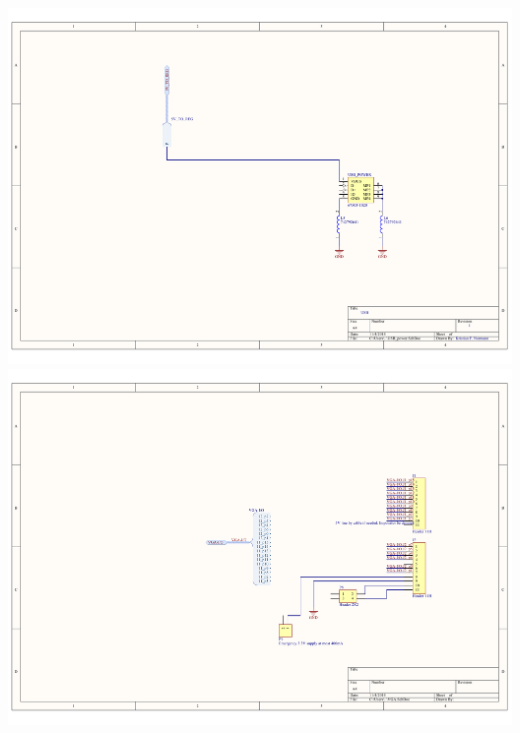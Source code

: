 \documentclass[../main/report.tex]{subfiles}
\begin{document}
\newpage
\includegraphics[width=\paperwidth]{../appendix/PCB_schematics/USB_power.PDF}
\newpage
\includegraphics[width=\paperwidth]{../appendix/PCB_schematics/VGA.PDF}
\end{document}
